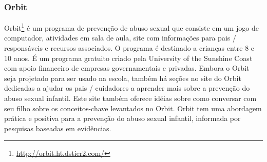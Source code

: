 


\subsubsection{Orbit}\label{sssec:Orbit}


Orbit\footnote{\url{http://orbit.ht.dstier2.com/}} é um programa de prevenção de abuso sexual que consiste em um jogo de computador, atividades em sala de aula, site com informações para pais / responsáveis e recursos associados. O programa é destinado a crianças entre 8 e 10 anos. É um programa gratuito criado pela University of the Sunshine Coast com apoio financeiro de empresas governamentais e privadas. Embora o Orbit seja projetado para ser usado na escola, também há seções no site do Orbit dedicadas a ajudar os pais / cuidadores a aprender mais sobre a prevenção do abuso sexual infantil. Este site também oferece idéias sobre como conversar com seu filho sobre os conceitos-chave levantados no Orbit. Orbit tem uma abordagem prática e positiva para a prevenção do abuso sexual infantil, informada por pesquisas baseadas em evidências. 

